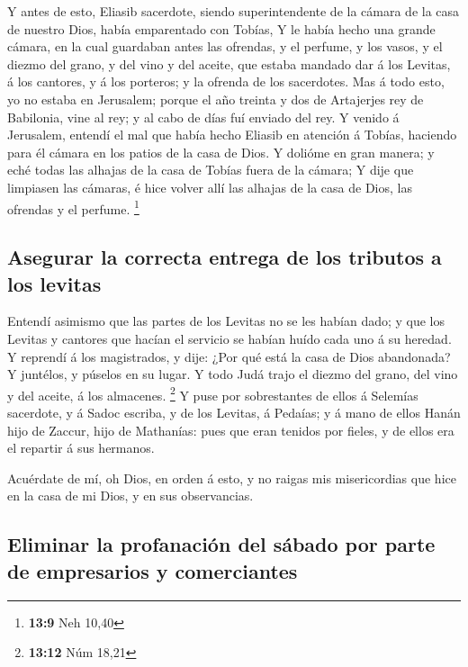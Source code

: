  Y antes de esto, Eliasib sacerdote, siendo superintendente
de la cámara de la casa de nuestro Dios, había emparentado con Tobías,
 Y le había hecho una grande cámara, en la cual guardaban
antes las ofrendas, y el perfume, y los vasos, y el diezmo del grano, y
del vino y del aceite, que estaba mandado dar á los Levitas, á los
cantores, y á los porteros; y la ofrenda de los sacerdotes. 
Mas á todo esto, yo no estaba en Jerusalem; porque el año treinta y dos
de Artajerjes rey de Babilonia, vine al rey; y al cabo de días fuí
enviado del rey.  Y venido á Jerusalem, entendí el mal que
había hecho Eliasib en atención á Tobías, haciendo para él cámara en los
patios de la casa de Dios.  Y dolióme en gran manera; y eché
todas las alhajas de la casa de Tobías fuera de la cámara; 
Y dije que limpiasen las cámaras, é hice volver allí las alhajas de la
casa de Dios, las ofrendas y el perfume. \footnote{\textbf{13:9} Neh
  10,40}

\hypertarget{asegurar-la-correcta-entrega-de-los-tributos-a-los-levitas}{%
\subsection{Asegurar la correcta entrega de los tributos a los
levitas}\label{asegurar-la-correcta-entrega-de-los-tributos-a-los-levitas}}

 Entendí asimismo que las partes de los Levitas no se les
habían dado; y que los Levitas y cantores que hacían el servicio se
habían huído cada uno á su heredad.  Y reprendí á los
magistrados, y dije: ¿Por qué está la casa de Dios abandonada? Y
juntélos, y púselos en su lugar.  Y todo Judá trajo el
diezmo del grano, del vino y del aceite, á los almacenes. \footnote{\textbf{13:12}
  Núm 18,21}  Y puse por sobrestantes de ellos á Selemías
sacerdote, y á Sadoc escriba, y de los Levitas, á Pedaías; y á mano de
ellos Hanán hijo de Zaccur, hijo de Mathanías: pues que eran tenidos por
fieles, y de ellos era el repartir á sus hermanos.

 Acuérdate de mí, oh Dios, en orden á esto, y no raigas mis
misericordias que hice en la casa de mi Dios, y en sus observancias.

\hypertarget{eliminar-la-profanaciuxf3n-del-suxe1bado-por-parte-de-empresarios-y-comerciantes}{%
\subsection{Eliminar la profanación del sábado por parte de empresarios
y
comerciantes}\label{eliminar-la-profanaciuxf3n-del-suxe1bado-por-parte-de-empresarios-y-comerciantes}}

